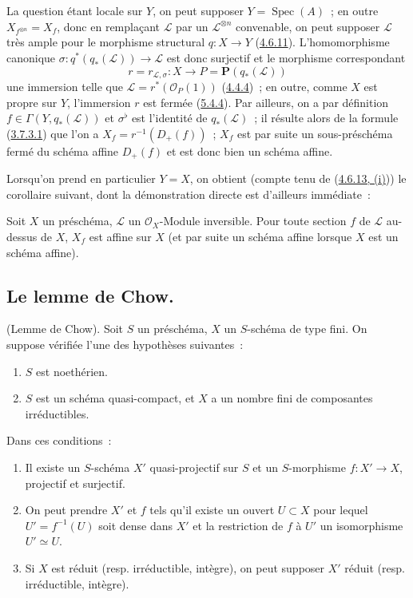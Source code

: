 
La question étant locale sur $Y$, on peut supposer
$Y=\operatorname{Spec}(A)$~; en outre
$X_{f^{\otimes n}}=X_f$, donc en remplaçant $\mathcal{L}$ par un
$\mathcal{L}^{\otimes n}$ convenable, on peut supposer $\mathcal{L}$ très
ample pour le morphisme structural $q:X\to Y$
(\hyperref[II.4.6.11-fr]{4.6.11}). L'homomorphisme canonique
$\sigma:q^*(q_*(\mathcal{L}))\to\mathcal{L}$ est donc surjectif et le
morphisme correspondant
\[
r=r_{\mathcal{L},\sigma}:X\to P=\mathbf{P}(q_*(\mathcal{L}))
\]
une immersion telle que $\mathcal{L}=r^*(\mathcal{O}_P(1))$
(\hyperref[II.4.4.4-fr]{4.4.4})~; en outre, comme $X$ est propre sur $Y$,
l'immersion $r$ est fermée (\hyperref[II.5.4.4-fr]{5.4.4}). Par ailleurs, on
a par définition $f\in\Gamma(Y,q_*(\mathcal{L}))$ et $\sigma^\flat$ est
l'identité de $q_*(\mathcal{L})$~; il résulte alors de la formule
(\hyperref[II.3.7.3.1-fr]{3.7.3.1}) que l'on a $X_f=r^{-1}(D_+(f))$~; $X_f$
est par suite un sous-préschéma fermé du schéma affine $D_+(f)$ et est donc
bien un schéma affine.

Lorsqu'on prend en particulier $Y=X$, on obtient (compte tenu de
(\hyperref[II.4.6.13-fr]{4.6.13, (i)})) le corollaire suivant, dont la
démonstration directe est d'ailleurs immédiate~:

\begin{corollary}[5.5.8]
\label{II.5.5.8-fr}
Soit $X$ un préschéma, $\mathcal{L}$ un $\mathcal{O}_X$-Module inversible.
Pour toute section $f$ de $\mathcal{L}$ au-dessus de $X$, $X_f$ est affine
sur $X$ (et par suite un schéma affine lorsque $X$ est un schéma affine).
\end{corollary}

\subsection{Le lemme de Chow.}
\label{subsection:II.5.6-fr}

\begin{theorem}[5.6.1]
\label{II.5.6.1-fr}
(Lemme de Chow). Soit $S$ un préschéma, $X$ un $S$-schéma de type fini. On
suppose vérifiée l'une des hypothèses suivantes~:
\begin{enumerate}
  \item[\rm{a)}] $S$ est noethérien.
  \item[\rm{b)}] $S$ est un schéma quasi-compact, et $X$ a un nombre fini de
  composantes irréductibles.
\end{enumerate}
Dans ces conditions~:
\begin{enumerate}
  \item[\rm{(i)}] Il existe un $S$-schéma $X'$ quasi-projectif sur $S$ et un
  $S$-morphisme $f:X'\to X$, projectif et surjectif.
  \item[\rm{(ii)}] On peut prendre $X'$ et $f$ tels qu'il existe un ouvert
  $U\subset X$ pour lequel $U'=f^{-1}(U)$ soit dense dans $X'$ et la
  restriction de $f$ à $U'$ un isomorphisme $U'\simeq U$.
  \item[\rm{(iii)}] Si $X$ est réduit (resp. irréductible, intègre), on peut
  supposer $X'$ réduit (resp. irréductible, intègre).
\end{enumerate}
\end{theorem}

